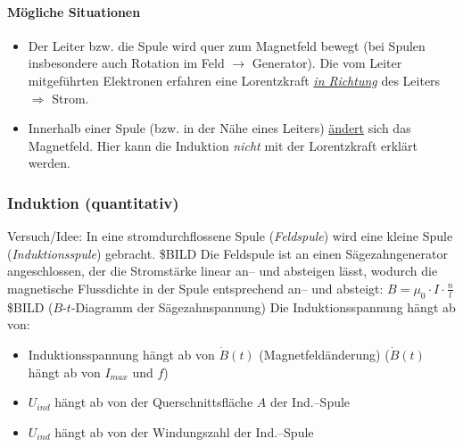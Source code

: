 \documentclass[a4paper]{scrartcl}
\begin{document}
\paragraph{Mögliche Situationen}
\begin{itemize}
	\item Der Leiter bzw. die Spule wird quer zum Magnetfeld bewegt (bei Spulen
	insbesondere auch Rotation im Feld $\rightarrow$ Generator). Die vom Leiter
	mitgeführten  Elektronen erfahren eine Lorentzkraft \emph{\underline{in
	Richtung}} des Leiters $\Rightarrow$ Strom.
	\item Innerhalb einer Spule (bzw. in der Nähe eines Leiters)
	\underline{ändert}
sich das Magnetfeld. Hier kann die Induktion \emph{nicht} mit der Lorentzkraft
erklärt werden.
\end{itemize}

\subsubsection{Induktion (quantitativ)}
Versuch/Idee: In eine stromdurchflossene Spule (\emph{Feldspule}) wird eine
kleine Spule (\emph{Induktionsspule}) gebracht.
\$BILD
Die Feldspule ist an einen Sägezahngenerator angeschlossen, der die Stromstärke
linear an-- und absteigen lässt, wodurch die magnetische Flussdichte in der
Spule entsprechend an-- und absteigt: $B = \mu_0 \cdot I \cdot \frac{n}{l}$
\$BILD ($B$-$t$-Diagramm der Sägezahnspannung)
Die Induktionsspannung hängt ab von:
\begin{itemize}
	\item Induktionsspannung hängt ab von $\dot{B}(t)$ (Magnetfeldänderung)
		($\dot{B}(t)$ hängt ab von $I_{max}$ und $f$)
	\item $U_{ind}$ hängt ab von der Querschnittsfläche $A$ der Ind.--Spule
	\item $U_{ind}$ hängt ab von der Windungszahl der Ind.--Spule
\end{itemize}
\end{document}
